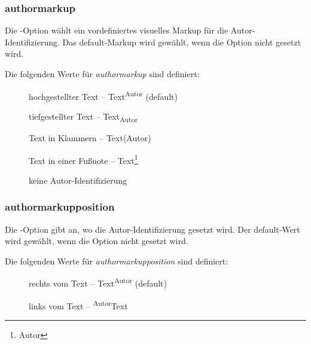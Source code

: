 

\subsubsection{authormarkup}


Die -Option wählt ein vordefiniertes visuelles Markup für die Autor-Identifizierung.
Das default-Markup wird gewählt, wenn die Option nicht gesetzt wird.

Die folgenden Werte für \emph{authormarkup} sind definiert:

\begin{description}
	\item [] hochgestellter Text -- Text\textsuperscript{Autor} (default)
	\item [] tiefgestellter Text -- Text\textsubscript{Autor}
	\item [] Text in Klammern -- Text(Autor)
	\item [] Text in einer Fußnote -- Text\footnote{Autor}
	\item [] keine Autor-Identifizierung
\end{description}



\subsubsection{authormarkupposition}


Die -Option gibt an, wo die Autor-Identifizierung gesetzt wird.
Der default-Wert wird gewählt, wenn die Option nicht gesetzt wird.

Die folgenden Werte für \emph{authormarkupposition} sind definiert:

\begin{description}
	\item [] rechts vom Text -- Text\textsuperscript{Autor} (default)
	\item [] links vom Text -- \textsuperscript{Autor}Text
\end{description}



